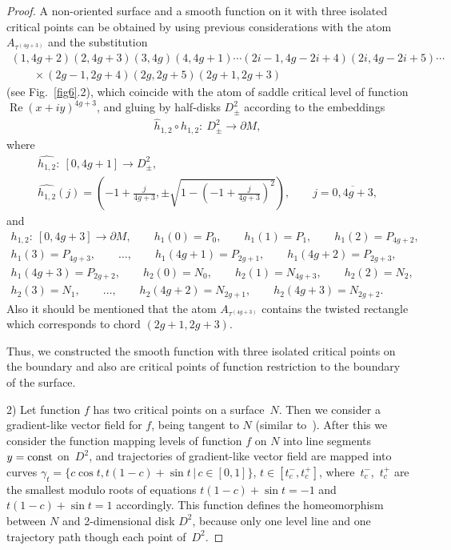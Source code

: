 \documentclass[10pt,a4paper]{amsart}
\numberwithin{equation}{section}
\begin{document}
\begin{proof}
A non-oriented surface and a smooth function on it with three isolated critical points can be obtained by using previous considerations with the atom $A_{\tau^{(4g+3)}}$ and the substitution
\begin{gather*}
(1,4g+2)(2,4g+3)(3,4g)(4,4g+1)\cdots(2i-1,4g-2i+4)(2i,4g-2i+5)\cdots\\
\qquad{}\times (2g-1,2g+4)(2g,2g+5)(2g+1,2g+3)
\end{gather*}
(see Fig.~\ref{fig6}.2), which coincide with the atom of saddle critical level of function $\operatorname{Re}(x+iy)^{4g+3}$, and gluing by half-disks $D^{2}_{\pm}$ according to the embeddings
\begin{gather*}
\widehat{h}_{1,2} \circ h_{1,2}\colon \ D^{2}_{\pm} \rightarrow \partial M,
 \end{gather*}
 where
 \begin{gather*}
 \widehat{h_{1,2}}\colon \ [0,4g+1]\rightarrow D^{2}_{\pm}, \\
 \widehat{h_{1,2}}(j)=\left(-1+\frac{j}{4g+3},\pm\sqrt{1-(-1+\frac{j}{4g+3})^{2}}\right), \qquad j=\overline{0,4g+3},
 \end{gather*}
 and
 \begin{gather*}
 h_{1,2}\colon \ [0,4g+3] \rightarrow \partial M,
\qquad h_{1}(0)=P_{0}, \qquad h_{1}(1)=P_{1}, \qquad h_{1}(2)=P_{4g+2}, \\
h_{1}(3)=P_{4g+3}, \qquad \ldots, \qquad h_{1}(4g+1)=P_{2g+1}, \qquad h_{1}(4g+2)=P_{2g+3},\\
 h_{1}(4g+3)=P_{2g+2}, \qquad h_{2}(0)=N_{0}, \qquad h_{2}(1)=N_{4g+3}, \qquad h_{2}(2)=N_{2},\\
 h_{2}(3)=N_{1}, \qquad \ldots, \qquad h_{2}(4g+2)=N_{2g+1}, \qquad h_{2}(4g+3)=N_{2g+2}.
\end{gather*}
Also it should be mentioned that the atom $A_{\tau^{(4g+3)}}$ contains the twisted rectangle which corresponds to chord $(2g+1,2g+3)$.

Thus, we constructed the smooth function with three isolated critical points on the boundary and also are critical points of function restriction to the boundary of the surface.

2) Let function $f$ has two critical points on a surface~$N$. Then we consider a gradient-like vector f\/ield for $f$, being tangent to $N$ (similar to~\cite{Borodzic/Nemeti/Ranicki}). After this we consider the function mapping levels of function $f$ on $N$ into line segments $y={\rm const}$ on~$D^{2}$, and trajectories of gradient-like vector f\/ield are mapped into curves $\gamma_{t}=\{c\cos{t},t(1-c)+\sin{t} \,|\, c\in[0,1]\}$, $t\in[t_{c}^{-},t_{c}^{+}]$, where~$t_{c}^{-}$,~$t_{c}^{+}$ are the smallest modulo roots of equations $t(1-c)+\sin{t}=-1$ and $t(1-c)+\sin{t}=1$ accordingly. This function def\/ines the homeomorphism between $N$ and 2-dimensional disk $D^{2}$, because only one level line and one trajectory path though each point of~$D^{2}$.


\end{proof}
\end{document}
